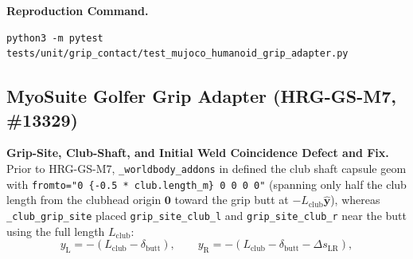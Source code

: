 \documentclass[11pt,a4paper]{article}
\begin{document}
\textbf{Reproduction Command.}
\begin{verbatim}
python3 -m pytest tests/unit/grip_contact/test_mujoco_humanoid_grip_adapter.py
\end{verbatim}

\subsection{MyoSuite Golfer Grip Adapter (HRG-GS-M7, \#13329)}
\label{sec:hrg-gs-m7-myosuite-grip}

\textbf{Grip-Site, Club-Shaft, and Initial Weld Coincidence Defect and Fix.}
Prior to HRG-GS-M7, \texttt{\_worldbody\_addons} in  defined the club shaft capsule geom with \texttt{fromto="0 \{-0.5 * club.length\_m\} 0 0 0 0"} (spanning only half the club length from the clubhead origin $\mathbf{0}$ toward the grip butt at $-L_{\mathrm{club}}\hat{\mathbf{y}}$), whereas \texttt{\_club\_grip\_site} placed \texttt{grip\_site\_club\_l} and \texttt{grip\_site\_club\_r} near the butt using the full length $L_{\mathrm{club}}$:
\begin{equation}
y_{\mathrm{L}} = -\left(L_{\mathrm{club}} - \delta_{\mathrm{butt}}\right), \qquad
y_{\mathrm{R}} = -\left(L_{\mathrm{club}} - \delta_{\mathrm{butt}} - \Delta s_{\mathrm{LR}}\right),
\end{equation}
\end{document}
